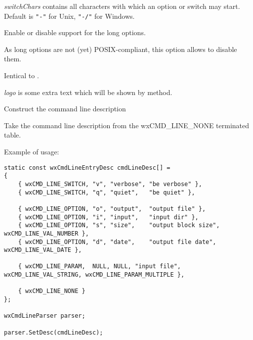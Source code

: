 {\it switchChars} contains all characters with which an option or switch may
start. Default is {\tt "-"} for Unix, {\tt "-/"} for Windows.

\label{wxcmdlineparserenablelongoptions}


Enable or disable support for the long options.

As long options are not (yet) POSIX-compliant, this option allows to disable
them.



\label{wxcmdlineparserdisablelongoptions}


Ientical to .

\label{wxcmdlineparsersetlogo}


{\it logo} is some extra text which will be shown by 
 method.

\label{wxcmdlineparsersetdesc}


Construct the command line description

Take the command line description from the wxCMD\_LINE\_NONE terminated table.

Example of usage:

\begin{verbatim}
static const wxCmdLineEntryDesc cmdLineDesc[] =
{
    { wxCMD_LINE_SWITCH, "v", "verbose", "be verbose" },
    { wxCMD_LINE_SWITCH, "q", "quiet",   "be quiet" },

    { wxCMD_LINE_OPTION, "o", "output",  "output file" },
    { wxCMD_LINE_OPTION, "i", "input",   "input dir" },
    { wxCMD_LINE_OPTION, "s", "size",    "output block size", wxCMD_LINE_VAL_NUMBER },
    { wxCMD_LINE_OPTION, "d", "date",    "output file date", wxCMD_LINE_VAL_DATE },

    { wxCMD_LINE_PARAM,  NULL, NULL, "input file", wxCMD_LINE_VAL_STRING, wxCMD_LINE_PARAM_MULTIPLE },

    { wxCMD_LINE_NONE }
};

wxCmdLineParser parser;

parser.SetDesc(cmdLineDesc);
\end{verbatim}

